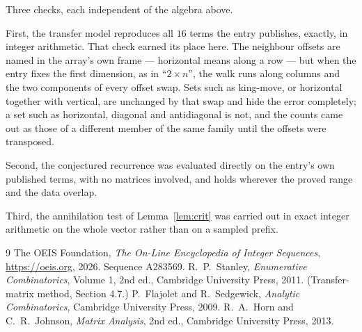 \documentclass[11pt,a4paper]{article}
\theoremstyle{plain}
\theoremstyle{definition}
\begin{document}
Three checks, each independent of the algebra above.

First, the transfer model reproduces all $16$ terms the entry publishes, exactly, in
integer arithmetic. That check earned its place here. The neighbour offsets are named in the
array's own frame --- horizontal means along a row --- but when the entry fixes the first
dimension, as in ``$2\times n$'', the walk runs along columns and the two components of every
offset swap. Sets such as king-move, or horizontal together with vertical, are unchanged by
that swap and hide the error completely; a set such as horizontal, diagonal and antidiagonal
is not, and the counts came out as those of a different member of the same family until the
offsets were transposed.

Second, the conjectured recurrence was evaluated directly on the entry's own published terms,
with no matrices involved, and holds wherever the proved range and the data overlap.

Third, the annihilation test of Lemma~\ref{lem:crit} was carried out in exact integer
arithmetic on the whole vector rather than on a sampled prefix.

\begin{thebibliography}{9}
 The OEIS Foundation, \emph{The On-Line Encyclopedia of Integer
Sequences}, \url{https://oeis.org}, 2026. Sequence A283569.
 R.~P.~Stanley, \emph{Enumerative Combinatorics}, Volume 1, 2nd ed.,
Cambridge University Press, 2011. (Transfer-matrix method, Section 4.7.)
 P.~Flajolet and R.~Sedgewick, \emph{Analytic Combinatorics}, Cambridge
University Press, 2009.
 R.~A.~Horn and C.~R.~Johnson, \emph{Matrix Analysis}, 2nd ed., Cambridge
University Press, 2013.
\end{thebibliography}
\end{document}
